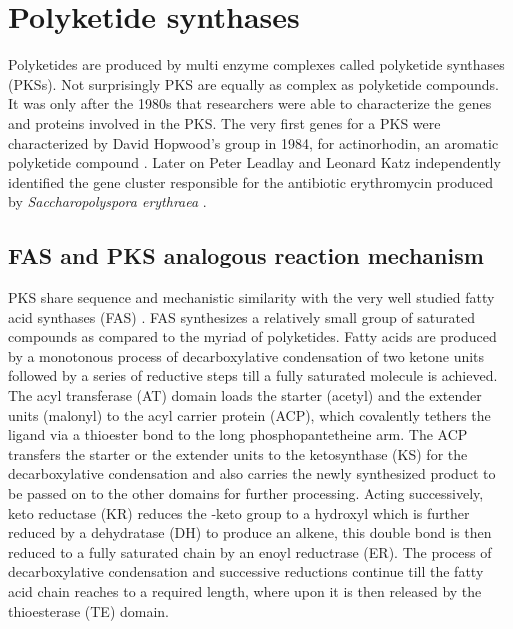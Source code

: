 	\section{Polyketide synthases}	
	\label{sec:PKS}
	Polyketides are produced by multi enzyme complexes called polyketide synthases (PKSs). Not surprisingly PKS are equally as complex as polyketide compounds. It was only after the 1980s that researchers were able to characterize the genes and proteins involved in the PKS. The very first genes for a PKS were characterized by David Hopwood's group in 1984, for actinorhodin, an aromatic polyketide compound \parencite{Malpartida}. Later on Peter Leadlay and Leonard Katz independently identified the gene cluster responsible for the antibiotic erythromycin produced by \textit{Saccharopolyspora erythraea} \parencite{Cortes1990, Tuan1990}.
	
		\subsection{FAS and PKS analogous reaction mechanism}
		\label{sec:FAS}
		PKS share sequence and mechanistic similarity with the very well studied fatty acid synthases (FAS) . FAS synthesizes a relatively small group of saturated compounds as compared to the myriad of polyketides. Fatty acids are produced by a monotonous process of decarboxylative condensation of two ketone units followed by a series of reductive steps till a fully saturated molecule is achieved. The acyl transferase (AT)  domain loads the starter (acetyl) and the extender units (malonyl) to the acyl carrier protein (ACP),  which covalently tethers the ligand via a thioester bond to the long phosphopantetheine arm. The ACP transfers the starter or the extender units to the ketosynthase (KS)  for the decarboxylative condensation and also carries the newly synthesized product to be passed on to the other domains for further processing. Acting successively, keto reductase (KR)  reduces the \bet-keto group to a hydroxyl which is further reduced by a dehydratase (DH)  to produce an alkene, this double bond is then reduced to a fully saturated chain by an enoyl reductrase (ER).  The process of decarboxylative condensation and successive reductions continue till the fatty acid chain reaches to a required length, where upon it is then released by the thioesterase (TE)  domain.
				
